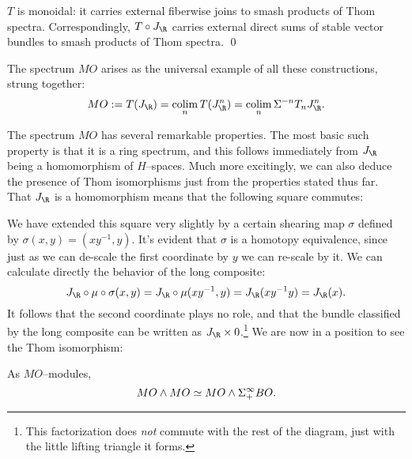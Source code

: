 \begin{lemma}\label{ThomSpacesAreMonoidal}
$T$ is monoidal: it carries external fiberwise joins to smash products of Thom spectra.  Correspondingly, $T \circ J_{\R}$ carries external direct sums of stable vector bundles to smash products of Thom spectra. \qed
\end{lemma}

\begin{definition}
The spectrum $MO$ arises as the universal example of all these constructions, strung together:
\[MO := T(J_{\R}) = \colim_n T(J_{\R}^n) = \colim_n \Susp^{-n} T_n J_{\R}^n.\]
\end{definition}

The spectrum $MO$ has several remarkable properties.  The most basic such property is that it is a ring spectrum, and this follows immediately from $J_{\R}$ being a homomorphism of $H$--spaces.  Much more excitingly, we can also deduce the presence of Thom isomorphisms just from the properties stated thus far.  That $J_{\R}$ is a homomorphism means that the following square commutes:
\begin{center}
\end{center}
We have extended this square very slightly by a certain shearing map $\sigma$ defined by $\sigma(x, y) = (xy^{-1}, y)$.
It's evident that $\sigma$ is a homotopy equivalence, since just as we can de-scale the first coordinate by $y$ we can re-scale by it.  We can calculate directly the behavior of the long composite: \[J_{\R} \circ \mu \circ \sigma(x, y) = J_{\R} \circ \mu(xy^{-1}, y) = J_{\R}(xy^{-1}y) = J_{\R}(x).\]  It follows that the second coordinate plays no role, and that the bundle classified by the long composite can be written as $J_{\R} \times 0$.\footnote{This factorization does \emph{not} commute with the rest of the diagram, just with the little lifting triangle it forms.}  We are now in a position to see the Thom isomorphism:
\begin{lemma}
As $MO$--modules, \[MO \wedge MO \simeq MO \wedge \Sigma^\infty_+ BO.\]
\end{lemma}
